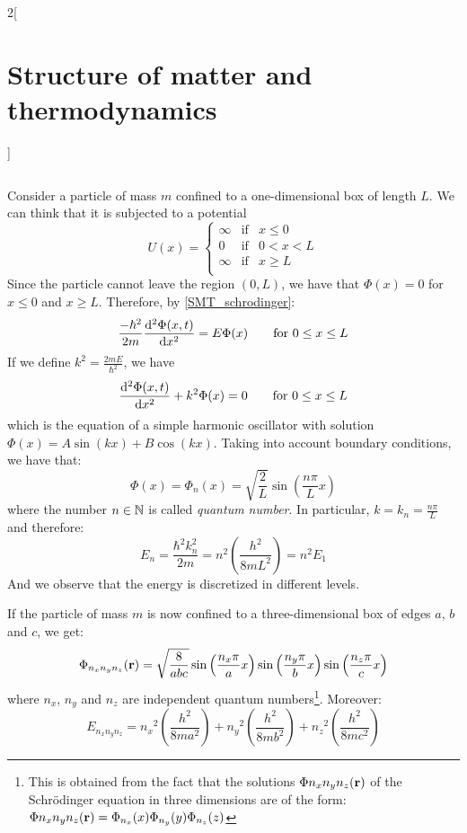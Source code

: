 \documentclass[../../../main.tex]{subfiles}
\begin{document}
\begin{multicols}{2}[\section{Structure of matter and thermodynamics}]
\begin{definition}
\begin{equation}
        \end{equation}
    \end{definition}
    \begin{prop}
        Consider a particle of mass $m$ confined to a one-dimensional box of length $L$. We can think that it is subjected to a potential $$U(x)=\left\{
            \begin{array}{lll}
                \infty & \text{if} & x\leq 0   \\
                0      & \text{if} & 0 < x < L \\
                \infty & \text{if} & x\geq L   \\
            \end{array}
            \right.$$
        Since the particle cannot leave the region $(0,L)$, we have that $\Phi(x)=0$ for $x\leq 0$ and $x\geq L$. Therefore, by \cref{SMT_schrodinger}:
        $$
            \frac{-\hbar^2}{2m}\dv[2]{\Phi(x,t)}{x}=E\Phi(x)\qquad\text{for }0\leq x\leq L
        $$
        If we define $k^2=\frac{2m E}{\hbar^2}$, we have
        $$
            \dv[2]{\Phi(x,t)}{x}+k^2\Phi(x)=0\qquad\text{for }0\leq x\leq L
        $$
        which is the equation of a simple harmonic oscillator with solution $\Phi(x)=A\sin(kx)+B\cos(kx)$. Taking into account boundary conditions, we have that: $$\Phi(x)=\Phi_n(x)=\sqrt{\frac{2}{L}}\sin\left(\frac{n\pi}{L}x\right)$$ where the number $n\in\mathbb{N}$ is called \textit{quantum number}. In particular, $k=k_n=\frac{n\pi}{L}$ and therefore: $$E_n=\frac{\hbar^2k_n^2}{2m}=n^2\left(\frac{h^2}{8mL^2}\right)=n^2E_1$$ And we observe that the energy is discretized in different levels.
    \end{prop}
    \begin{prop}
        If the particle of mass $m$ is now confined to a three-dimensional box of edges $a$, $b$ and $c$, we get:
        $$\Phi_{n_xn_yn_z}(\boldsymbol{\mathrm{r}})=\sqrt{\frac{8}{abc}}\sin\left(\frac{n_x\pi}{a}x\right)\sin\left(\frac{n_y\pi}{b}x\right)\sin\left(\frac{n_z\pi}{c}x\right)$$
        where $n_x$, $n_y$ and $n_z$ are independent quantum numbers\footnote{This is obtained from the fact that the solutions $\Phi{n_xn_yn_z}(\boldsymbol{\mathrm{r}})$ of the Schrödinger equation in three dimensions are of the form: $\Phi{n_xn_yn_z}(\boldsymbol{\mathrm{r}})=\Phi_{n_x}(x)\Phi_{n_y}(y)\Phi_{n_z}(z)$}. Moreover:
        $$E_{n_xn_yn_z}={n_x}^2\left(\frac{h^2}{8ma^2}\right)+{n_y}^2\left(\frac{h^2}{8mb^2}\right)+{n_z}^2\left(\frac{h^2}{8mc^2}\right)$$
    \end{prop}
    \begin{definition}

\end{definition}
\end{multicols}
\end{document}
